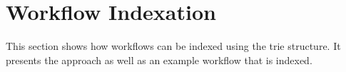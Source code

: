 \section{Workflow Indexation}
\label{sec:indexation}
This section shows how workflows can be indexed using the trie structure. It presents the approach as well as an example workflow that is indexed.